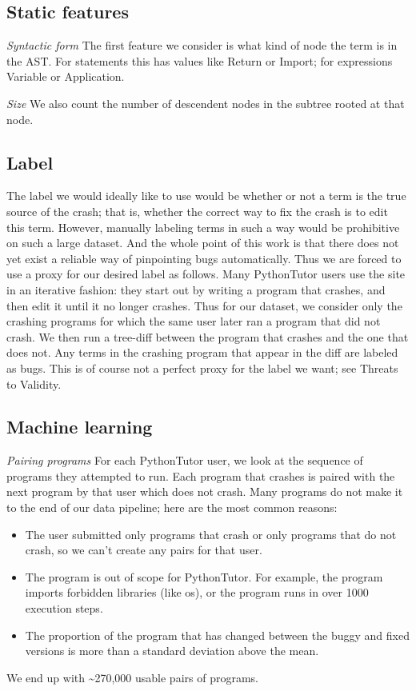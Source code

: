 \documentclass[conference]{IEEEtran}
\begin{document}
\subsection{Static features}

\emph{Syntactic form} The first feature we consider is what kind of node the term
is in the AST. For statements this has values like Return or Import; for expressions
Variable or Application.

\emph{Size} We also count the number of descendent nodes in the subtree rooted at that node.

\subsection{Label}

The label we would ideally like to use would be whether or not a term is the
true source of the crash; that is, whether the correct way to fix the crash is
to edit this term. However, manually labeling terms in such a way would be
prohibitive on such a large dataset. And the whole point of this work is that
there does not yet exist a reliable way of pinpointing bugs automatically. Thus
we are forced to use a proxy for our desired label as follows. Many PythonTutor
users use the site in an iterative fashion: they start out by writing
a program that crashes, and then edit it until it no longer crashes. Thus for our
dataset, we consider only the crashing programs for which the same user later
ran a program that did not crash. We then run a tree-diff \cite{tree-diff}
between the program that crashes and the one that does not. Any terms in the
crashing program that appear in the diff are labeled as bugs. This is of course
not a perfect proxy for the label we want; see Threats to Validity.

\subsection{Machine learning}

\emph{Pairing programs} For each PythonTutor user, we look at the sequence of
programs they attempted to run. Each program that crashes is paired with the next
program by that user which does not crash. Many programs do not make it to the
end of our data pipeline; here are the most common reasons:
\begin{itemize}
    \item The user submitted only programs that crash or only programs that do
    not crash, so we can't create any pairs for that user.
    \item The program is out of scope for PythonTutor. For
    example, the program imports forbidden libraries (like os), or the program
    runs in over 1000 execution steps.
    \item The proportion of the program that has changed between the buggy and
    fixed versions is more than a standard deviation above the mean.
\end{itemize}
We end up with \textasciitilde270,000 usable pairs of programs.
\end{document}
